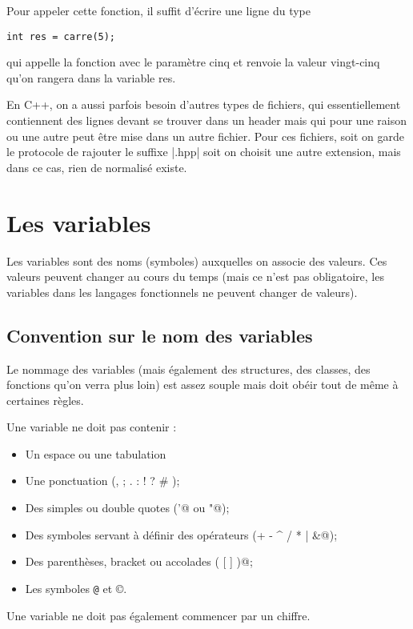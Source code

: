 Pour appeler cette fonction, il suffit d'écrire une ligne du type
\begin{lstlisting}[caption=Exemple d'utilisation de la fonction]
int res = carre(5);
\end{lstlisting}

qui appelle la fonction avec le paramètre cinq et renvoie la valeur vingt-cinq qu'on rangera dans la variable res.

En C++, on a aussi parfois besoin d'autres types de fichiers, qui essentiellement contiennent des lignes devant se trouver dans un header mais qui pour une raison ou une autre peut être mise dans un autre fichier. Pour ces fichiers, soit on garde le protocole de rajouter le suffixe |.hpp| soit on choisit une autre extension, mais dans ce cas, rien de normalisé existe.

\section{Les variables}

Les variables sont des noms (symboles) auxquelles on associe des valeurs. Ces valeurs peuvent changer au cours du temps (mais ce n'est pas obligatoire, les variables dans les langages fonctionnels ne peuvent changer de valeurs).


\subsection{Convention sur le nom des variables}

Le nommage des variables (mais également des structures, des classes, des fonctions qu'on verra plus loin) est assez souple mais doit obéir tout de même à certaines règles.

Une variable ne doit pas contenir :
\begin{itemize}
  \item Un espace ou une tabulation
  \item Une ponctuation (\verb@, ; . : ! ? # \@);
  \item Des simples ou double quotes (\verb@'@ ou \verb@"@);
  \item Des symboles servant à définir des opérateurs (\verb@+ - ^ / * | &@);
  \item Des parenthèses, bracket ou accolades \verb@( [ { } ] )@;
  \item Les symboles \verb!@! et \copyright.
\end{itemize}

Une variable ne doit pas également commencer par un chiffre.

